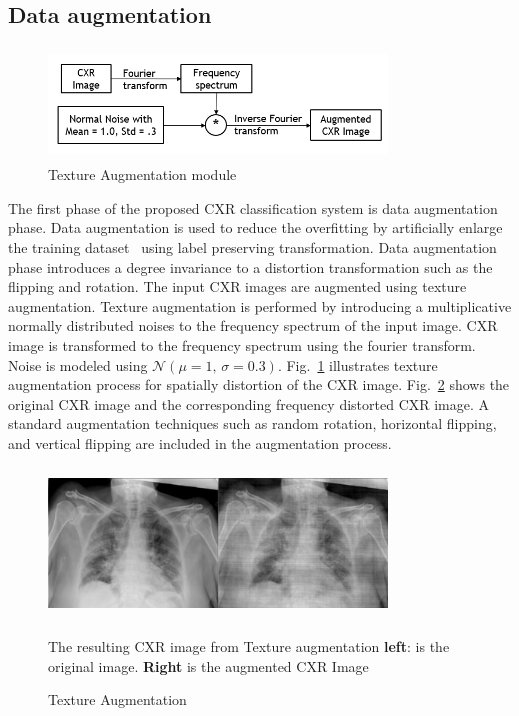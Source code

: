 \subsection{Data augmentation}

\begin{center}
    \begin{figure}[htbp]
    \centerline{\includegraphics[height=30mm,width=9cm]{Figures/TexAug.PNG}}
    \caption{Texture Augmentation module}
    \label{texaug}
    \end{figure}
    \end{center}
The first phase of the proposed CXR classification system is data augmentation phase. Data augmentation is used to reduce the overfitting by artificially enlarge the training dataset~\cite{krizhevsky2012imagenet} using label preserving transformation. Data augmentation phase introduces a degree invariance to a distortion transformation such as the flipping and rotation. The input CXR images are augmented using texture augmentation.  Texture augmentation is performed by introducing a multiplicative normally distributed noises to the frequency spectrum of the input image. CXR image is transformed to the frequency spectrum using the fourier transform.  Noise is modeled using $\mathcal{N}(\mu = 1,\,\sigma = 0.3)$. Fig.~\ref{texaug} illustrates texture augmentation process for spatially distortion of the CXR image. Fig.~\ref{resltaug} shows the original CXR image and the corresponding frequency distorted CXR image. A standard augmentation techniques such as random rotation, horizontal flipping, and vertical flipping are included in the augmentation process. 

\begin{center}
    \begin{figure}[htbp]
    \centerline{\includegraphics[height=40mm,width=9cm]{Figures/freqJitt.png}}
    \caption{Texture Augmentation}{The resulting CXR image from Texture augmentation \textbf{left}: is the original image. \textbf{Right} is the augmented  CXR Image}
    \label{resltaug}
    \end{figure}
    \end{center} 
    

